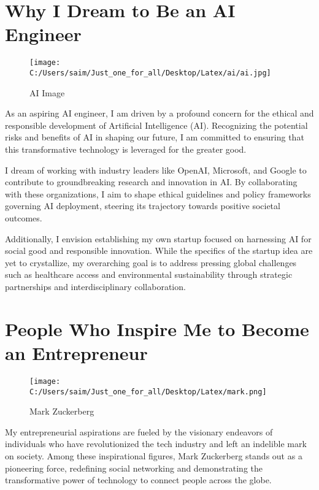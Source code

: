 \documentclass[12pt]{a4paper}{article}
\begin{document}
\section{Why I Dream to Be an AI Engineer}

\begin{wrapfigure}{r}{0.3\textwidth}
    \centering
    \texttt{[image: C:/Users/saim/Just\_one\_for\_all/Desktop/Latex/ai/ai.jpg]}
    \caption{AI Image}
    \label{fig:ai_image}
\end{wrapfigure}

As an aspiring AI engineer, I am driven by a profound concern for the ethical and responsible development of Artificial Intelligence (AI). Recognizing the potential risks and benefits of AI in shaping our future, I am committed to ensuring that this transformative technology is leveraged for the greater good.

I dream of working with industry leaders like OpenAI, Microsoft, and Google to contribute to groundbreaking research and innovation in AI. By collaborating with these organizations, I aim to shape ethical guidelines and policy frameworks governing AI deployment, steering its trajectory towards positive societal outcomes.

Additionally, I envision establishing my own startup focused on harnessing AI for social good and responsible innovation. While the specifics of the startup idea are yet to crystallize, my overarching goal is to address pressing global challenges such as healthcare access and environmental sustainability through strategic partnerships and interdisciplinary collaboration.

\section{People Who Inspire Me to Become an Entrepreneur}

\begin{wrapfigure}{r}{0.3\textwidth}
    \centering
    \texttt{[image: C:/Users/saim/Just\_one\_for\_all/Desktop/Latex/mark.png]}
    \caption{Mark Zuckerberg}
    \label{fig:mark_zuckerberg}
\end{wrapfigure}

My entrepreneurial aspirations are fueled by the visionary endeavors of individuals who have revolutionized the tech industry and left an indelible mark on society. Among these inspirational figures, Mark Zuckerberg stands out as a pioneering force, redefining social networking and demonstrating the transformative power of technology to connect people across the globe.
\end{document}
